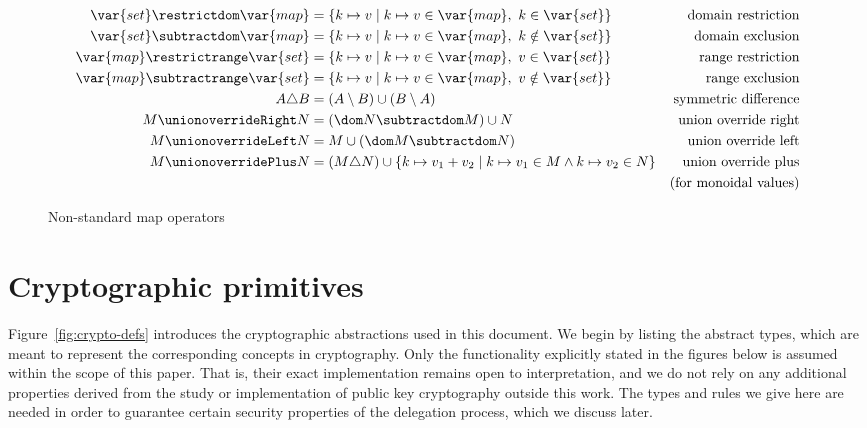 \documentclass[11pt,a4paper,dvipsnames]{article}
\theoremstyle{definition}
\theoremstyle{definition}
\begin{document}
\begin{figure}
  \begin{align*}
    \var{set} \restrictdom \var{map}
    & = \{ k \mapsto v \mid k \mapsto v \in \var{map}, ~ k \in \var{set} \}
    & \text{domain restriction}
    \\
    \var{set} \subtractdom \var{map}
    & = \{ k \mapsto v \mid k \mapsto v \in \var{map}, ~ k \notin \var{set} \}
    & \text{domain exclusion}
    \\
    \var{map} \restrictrange \var{set}
    & = \{ k \mapsto v \mid k \mapsto v \in \var{map}, ~ v \in \var{set} \}
    & \text{range restriction}
    \\
    \var{map} \subtractrange \var{set}
    & = \{ k \mapsto v \mid k \mapsto v \in \var{map}, ~ v \notin \var{set} \}
    & \text{range exclusion}
    \\
    A \triangle B
    & = (A \setminus B) \cup (B \setminus A)
    & \text{symmetric difference}
    \\
    M \unionoverrideRight N
    & = (\dom N \subtractdom M)\cup N
    & \text{union override right}
    \\
    M \unionoverrideLeft N
    & = M \cup (\dom M \subtractdom N)
    & \text{union override left}
    \\
    M \unionoverridePlus N
    & = (M \triangle N)
    \cup \{k\mapsto v_1+v_2\mid {k\mapsto v_1}\in M \land {k\mapsto v_2}\in N \}
    & \text{union override plus} \\
    & & \text{(for monoidal values)}\\
  \end{align*}
  \caption{Non-standard map operators}
  \label{fig:notation:nonstandard}
\end{figure}


\section{Cryptographic primitives}
\label{sec:crypto-primitives}


Figure~\ref{fig:crypto-defs} introduces the cryptographic abstractions used in
this document. We begin by listing the abstract types, which are meant to
represent the corresponding concepts in cryptography. Only the functionality
explicitly stated in the figures below is assumed within the scope of this paper.
That is, their exact
implementation remains open to interpretation, and we do not rely on
any additional properties derived from the study or implementation of public key
cryptography outside this work. The types and rules we give here are needed in
order to guarantee certain security properties of the delegation process, which
we discuss later.
\end{document}
